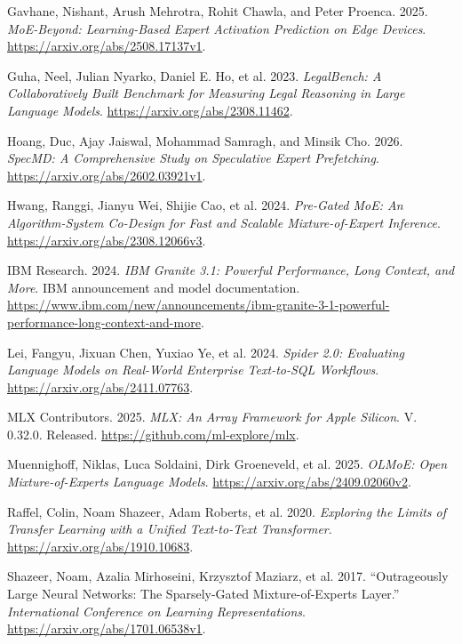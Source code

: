 \documentclass[
  10pt,
  letterpaper,
  10pt]{article}
\newlength{\cslhangindent}
\newenvironment{CSLReferences}[2] %
 {\begin{list}{}{%
  \setlength{\itemindent}{0pt}
  \setlength{\leftmargin}{0pt}
  \setlength{\parsep}{0pt}
  \ifodd #1
   \setlength{\leftmargin}{\cslhangindent}
   \setlength{\itemindent}{-1\cslhangindent}
  \fi
  \setlength{\itemsep}{#2\baselineskip}}}
 {\end{list}}
\begin{document}
\begin{CSLReferences}{1}{1}
Gavhane, Nishant, Arush Mehrotra, Rohit Chawla, and Peter Proenca. 2025.
\emph{{MoE-Beyond}: Learning-Based Expert Activation Prediction on Edge
Devices}. \url{https://arxiv.org/abs/2508.17137v1}.

{Guha, Neel, Julian Nyarko, Daniel E. Ho, et al.} 2023.
\emph{{LegalBench}: A Collaboratively Built Benchmark for Measuring
Legal Reasoning in Large Language Models}.
\url{https://arxiv.org/abs/2308.11462}.

Hoang, Duc, Ajay Jaiswal, Mohammad Samragh, and Minsik Cho. 2026.
\emph{{SpecMD}: A Comprehensive Study on Speculative Expert
Prefetching}. \url{https://arxiv.org/abs/2602.03921v1}.

Hwang, Ranggi, Jianyu Wei, Shijie Cao, et al. 2024. \emph{Pre-Gated
{MoE}: An Algorithm-System Co-Design for Fast and Scalable
Mixture-of-Expert Inference}. \url{https://arxiv.org/abs/2308.12066v3}.

IBM Research. 2024. \emph{{IBM Granite 3.1}: Powerful Performance, Long
Context, and More}. IBM announcement and model documentation.
\url{https://www.ibm.com/new/announcements/ibm-granite-3-1-powerful-performance-long-context-and-more}.

{Lei, Fangyu, Jixuan Chen, Yuxiao Ye, et al.} 2024. \emph{{Spider 2.0}:
Evaluating Language Models on Real-World Enterprise Text-to-{SQL}
Workflows}. \url{https://arxiv.org/abs/2411.07763}.

MLX Contributors. 2025. \emph{{MLX}: An Array Framework for Apple
Silicon}. V. 0.32.0. Released. \url{https://github.com/ml-explore/mlx}.

{Muennighoff, Niklas, Luca Soldaini, Dirk Groeneveld, et al.} 2025.
\emph{{OLMoE}: Open Mixture-of-Experts Language Models}.
\url{https://arxiv.org/abs/2409.02060v2}.

Raffel, Colin, Noam Shazeer, Adam Roberts, et al. 2020. \emph{Exploring
the Limits of Transfer Learning with a Unified Text-to-Text
Transformer}. \url{https://arxiv.org/abs/1910.10683}.

Shazeer, Noam, Azalia Mirhoseini, Krzysztof Maziarz, et al. 2017.
{``Outrageously Large Neural Networks: The Sparsely-Gated
Mixture-of-Experts Layer.''} \emph{International Conference on Learning
Representations}. \url{https://arxiv.org/abs/1701.06538v1}.


\end{CSLReferences}
\end{document}
